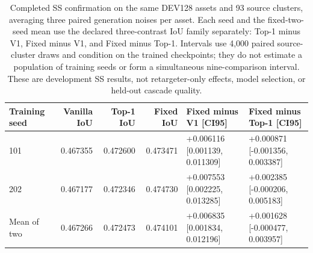 \begin{table}[t]
\centering\small
\setlength{\tabcolsep}{3pt}
\begin{tabular}{lrrrll}
\toprule
Training seed&Vanilla IoU&Top-1 IoU&Fixed IoU&Fixed minus V1 [CI95]&Fixed minus Top-1 [CI95]\\
\midrule
101&0.467355&0.472600&0.473471&+0.006116 [0.001139, 0.011309]&+0.000871 [-0.001356, 0.003387]\\
202&0.467177&0.472346&0.474730&+0.007553 [0.002225, 0.013285]&+0.002385 [-0.000206, 0.005183]\\
Mean of two&0.467266&0.472473&0.474101&+0.006835 [0.001834, 0.012196]&+0.001628 [-0.000477, 0.003957]\\
\bottomrule
\end{tabular}
\caption{Completed SS confirmation on the same DEV128 assets and 93 source
clusters, averaging three paired generation noises per asset. Each seed
and the fixed-two-seed mean use the declared three-contrast IoU family
separately: Top-1 minus V1, Fixed minus V1, and Fixed minus Top-1.
Intervals use 4,000 paired source-cluster draws and condition on the trained
checkpoints; they do not estimate a population of training seeds or form
a simultaneous nine-comparison interval. These are development SS results,
not retargeter-only effects, model selection, or held-out cascade quality.}
\label{tab:independent-ss}
\end{table}
